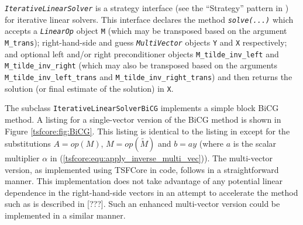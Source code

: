 \documentclass[10pt,fleqn]{article}
\begin{document}
\texttt{\textit{Iterative\-Linear\-Solver}} is a strategy interface
(see the ``Strategy'' pattern in \cite{ref:gama_et_al_1995}) for
iterative linear solvers.  This interface declares the method
\texttt{\textit{solve(...)}}  which accepts a
\texttt{\textit{LinearOp}} object \texttt{M} (which may be transposed
based on the argument \texttt{M\_trans}); right-hand-side and guess
\texttt{\textit{MultiVector}} objects \texttt{Y} and \texttt{X}
respectively; and optional left and/or right preconditioner objects
\texttt{M\_tilde\_inv\_left} and \texttt{M\_tilde\_inv\_right} (which
may also be transposed based on the arguments
\texttt{M\_tilde\_inv\_left\_trans} and
\texttt{M\_tilde\_inv\_right\_trans}) and then returns the solution
(or final estimate of the solution) in
\texttt{X}.

The subclass \texttt{Iterative\-Linear\-Solver\-BiCG} implements a
simple block BiCG method.  A listing for a single-vector version of
the BiCG method is shown in Figure \ref{tsfcore:fig:BiCG}.  This listing
is identical to the listing in \cite{ref:tmpls_for_iter_systems}
except for the substitutions $A = op(M)$, $M = op(\tilde{M})$ and $b
=a y$ (where $a$ is the scalar multiplier $\alpha$ in
(\ref{tsfcore:equ:apply_inverse_multi_vec})).  The multi-vector version,
as implemented using TSFCore in code, follows in a straightforward
manner.  This implementation does not take advantage of any potential
linear dependence in the right-hand-side vectors in an attempt to
accelerate the method such as is described in [???].  Such an enhanced
multi-vector version could be implemented in a similar manner.
\end{document}
